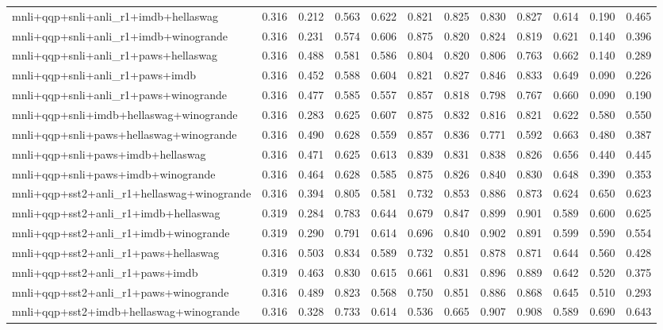 \begin{table}[t]
\begin{tabular}{lrrrrrrrrrrr}
    mnli+qqp+snli+anli\_r1+imdb+hellaswag & 0.316 & 0.212 & 0.563 & 0.622 & 0.821 & 0.825 & 0.830 & 0.827 & 0.614 & 0.190 & 0.465 \\
    mnli+qqp+snli+anli\_r1+imdb+winogrande & 0.316 & 0.231 & 0.574 & 0.606 & 0.875 & 0.820 & 0.824 & 0.819 & 0.621 & 0.140 & 0.396 \\
    mnli+qqp+snli+anli\_r1+paws+hellaswag & 0.316 & 0.488 & 0.581 & 0.586 & 0.804 & 0.820 & 0.806 & 0.763 & 0.662 & 0.140 & 0.289 \\
    mnli+qqp+snli+anli\_r1+paws+imdb & 0.316 & 0.452 & 0.588 & 0.604 & 0.821 & 0.827 & 0.846 & 0.833 & 0.649 & 0.090 & 0.226 \\
    mnli+qqp+snli+anli\_r1+paws+winogrande & 0.316 & 0.477 & 0.585 & 0.557 & 0.857 & 0.818 & 0.798 & 0.767 & 0.660 & 0.090 & 0.190 \\
    mnli+qqp+snli+imdb+hellaswag+winogrande & 0.316 & 0.283 & 0.625 & 0.607 & 0.875 & 0.832 & 0.816 & 0.821 & 0.622 & 0.580 & 0.550 \\
    mnli+qqp+snli+paws+hellaswag+winogrande & 0.316 & 0.490 & 0.628 & 0.559 & 0.857 & 0.836 & 0.771 & 0.592 & 0.663 & 0.480 & 0.387 \\
    mnli+qqp+snli+paws+imdb+hellaswag & 0.316 & 0.471 & 0.625 & 0.613 & 0.839 & 0.831 & 0.838 & 0.826 & 0.656 & 0.440 & 0.445 \\
    mnli+qqp+snli+paws+imdb+winogrande & 0.316 & 0.464 & 0.628 & 0.585 & 0.875 & 0.826 & 0.840 & 0.830 & 0.648 & 0.390 & 0.353 \\
    mnli+qqp+sst2+anli\_r1+hellaswag+winogrande & 0.316 & 0.394 & 0.805 & 0.581 & 0.732 & 0.853 & 0.886 & 0.873 & 0.624 & 0.650 & 0.623 \\
    mnli+qqp+sst2+anli\_r1+imdb+hellaswag & 0.319 & 0.284 & 0.783 & 0.644 & 0.679 & 0.847 & 0.899 & 0.901 & 0.589 & 0.600 & 0.625 \\
    mnli+qqp+sst2+anli\_r1+imdb+winogrande & 0.319 & 0.290 & 0.791 & 0.614 & 0.696 & 0.840 & 0.902 & 0.891 & 0.599 & 0.590 & 0.554 \\
    mnli+qqp+sst2+anli\_r1+paws+hellaswag & 0.316 & 0.503 & 0.834 & 0.589 & 0.732 & 0.851 & 0.878 & 0.871 & 0.644 & 0.560 & 0.428 \\
    mnli+qqp+sst2+anli\_r1+paws+imdb & 0.319 & 0.463 & 0.830 & 0.615 & 0.661 & 0.831 & 0.896 & 0.889 & 0.642 & 0.520 & 0.375 \\
    mnli+qqp+sst2+anli\_r1+paws+winogrande & 0.316 & 0.489 & 0.823 & 0.568 & 0.750 & 0.851 & 0.886 & 0.868 & 0.645 & 0.510 & 0.293 \\
    mnli+qqp+sst2+imdb+hellaswag+winogrande & 0.316 & 0.328 & 0.733 & 0.614 & 0.536 & 0.665 & 0.907 & 0.908 & 0.589 & 0.690 & 0.643 \\

\end{tabular}
\end{table}
